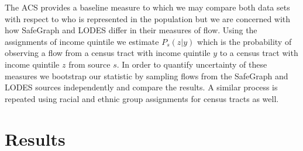 \documentclass[fleqn,10pt]{olplainarticle}
\begin{document}
The ACS provides a baseline measure to which we may compare both data sets with respect to who is represented in the population but we are concerned with how SafeGraph and LODES differ in their measures of flow. Using the assignments of income quintile we estimate $P_s(z|y)$ which is the probability of observing a flow from a census tract with income quintile $y$ to a census tract with income quintile $z$ from source $s$. In order to quantify uncertainty of these measures we bootstrap our statistic by sampling flows from the SafeGraph and LODES sources independently and compare the results. A similar process is repeated using racial and ethnic group assignments for census tracts as well.


\section*{Results}


\newpage

\end{document}
